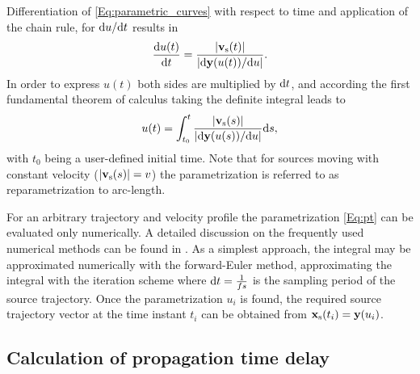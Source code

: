Differentiation of \eqref{Eq:parametric_curves} with respect to time and application of the chain rule, for $\mathrm{d} u / \mathrm{d} t$ results in
%
\begin{equation}
 \frac{\mathrm{d} u(t) }{\mathrm{d} t} = \frac{|\mathbf{v}_{\mathrm{s}}(t)|}{\left| \mathrm{d} \mathbf{y}(u(t)) / \mathrm{d} u \right|}.
\end{equation}
In order to express $u(t)$ both sides are multiplied by $\mathrm{d} t$, and according the first fundamental theorem of calculus taking the definite integral leads to
\begin{equation}
u(t) = \int_{t_0}^{t} \frac{|\mathbf{v}_{\mathrm{s}}(s)|}{\left| \mathrm{d} \mathbf{y}(u(s)) / \mathrm{d} u \right|} \mathrm{d} s,
\label{Eq:pt}
\end{equation}
with $t_0$ being a user-defined initial time.
Note that for sources moving with constant velocity ($|\mathbf{v}_{\mathrm{s}}(s)| = v$) the parametrization is referred to as reparametrization to arc-length.

For an arbitrary trajectory and velocity profile the parametrization \eqref{Eq:pt} can be evaluated only numerically.
A detailed discussion on the frequently used numerical methods can be found in \cite{Parent2012}.
As a simplest approach, the integral may be approximated numerically with the forward-Euler method, approximating the integral with the iteration scheme
where $\mathrm{d} t = \frac{1}{fs}$ is the sampling period of the source trajectory.
Once the parametrization $u_i$ is found, the required source trajectory vector at the time instant $t_i$ can be obtained from $\mathbf{x}_{\mathrm{s}}(t_i) = \mathbf{y}(u_i)$. 

\subsection{Calculation of propagation time delay}
	
